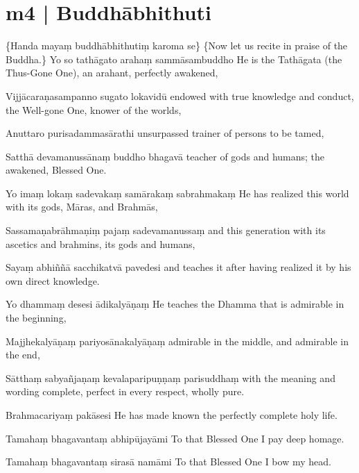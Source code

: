\section*{m4 | Buddhābhithuti}\label{sec:m04}

\begin{chantsubsection}
  \chantnote
    {\{Handa mayaṃ buddhābhithutiṃ karoma se\}}
  \chantnotetrans
    {\{Now let us recite in praise of the Buddha.\}}
  \chantgap
  \chantline
    {Yo so tathāgato arahaṃ sammāsambuddho}
    {He is the Tathāgata (the Thus-Gone One), an arahant, perfectly awakened,}

  \chantline
    {Vijjācaraṇasampanno sugato lokavidū}
    {endowed with true knowledge and conduct, the Well-gone One, knower of the worlds,}

  \chantline
    {Anuttaro purisadammasārathi}
    {unsurpassed trainer of persons to be tamed,}

  \chantline
    {Satthā devamanussānaṃ buddho bhagavā}
    {teacher of gods and humans; the awakened, Blessed One.}

  \chantline
    {Yo imaṃ lokaṃ sadevakaṃ samārakaṃ sabrahmakaṃ}
    {He has realized this world with its gods, Māras, and Brahmās,}

  \chantline
    {Sassamaṇabrāhmaṇiṃ pajaṃ sadevamanussaṃ}
    {and this generation with its ascetics and brahmins, its gods and humans,}

  \chantline
    {Sayaṃ abhiññā sacchikatvā pavedesi}
    {and teaches it after having realized it by his own direct knowledge.}

  \chantline
    {Yo dhammaṃ desesi ādikalyāṇaṃ}
    {He teaches the Dhamma that is admirable in the beginning,}

  \chantline
    {Majjhekalyāṇaṃ pariyosānakalyāṇaṃ}
    {admirable in the middle, and admirable in the end,}

  \chantline
    {Sātthaṃ sabyañjaṇaṃ kevalaparipuṇṇaṃ parisuddhaṃ}
    {with the meaning and wording complete, perfect in every respect, wholly pure.}

  \chantline
    {Brahmacariyaṃ pakāsesi}
    {He has made known the perfectly complete holy life.}

  \chantline
    {Tamahaṃ bhagavantaṃ abhipūjayāmi}
    {To that Blessed One I pay deep homage.}

  \chantline
    {Tamahaṃ bhagavantaṃ sirasā namāmi}
    {To that Blessed One I bow my head.}

\end{chantsubsection}
